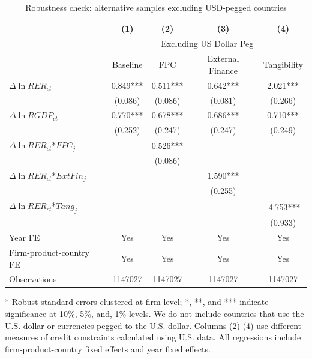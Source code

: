 \begin{table}[htbp]
	\centering
	\caption{Robustness check: alternative samples excluding USD-pegged countries}
	\begin{threeparttable}
	\begin{tabular}{lcccc}
		\toprule
		& (1)   & (2)   & (3)   & (4) \\
		\midrule
		& \multicolumn{4}{c}{Excluding US Dollar Peg} \\
		& Baseline & FPC   & External Finance & Tangibility \\
		\midrule
		$\Delta \ln RER_{ct}$ & 0.849*** & 0.511*** & 0.642*** & 2.021*** \\
		& (0.086) & (0.086) & (0.081) & (0.266) \\
		$\Delta \ln RGDP_{ct}$ & 0.770*** & 0.678*** & 0.686*** & 0.710*** \\
		& (0.252) & (0.247) & (0.247) & (0.249) \\
		$\Delta \ln RER_{ct}$*$FPC_{j}$ &    & 0.526*** &       &  \\
            & & (0.086) &       &  \\
		$\Delta \ln RER_{ct}$*$ExtFin_{j}$ & &       & 1.590*** &  \\
		& &       & (0.255) &  \\
		$\Delta \ln RER_{ct}$*$Tang_{j}$ & &       &       & -4.753*** \\
		& &       &       & (0.933) \\
		Year FE  &   Yes    & Yes   & Yes   & Yes \\
		Firm-product-country FE &   Yes    & Yes   & Yes   & Yes \\
		Observations & 1147027 & 1147027 & 1147027 & 1147027 \\
		\bottomrule
	\end{tabular}
	\begin{tablenotes}
		\footnotesize
		\item[*] Robust standard errors clustered at firm level; *, **, and *** indicate significance at 10\%, 5\%, and, 1\% levels. We do not include countries that use the U.S. dollar or currencies pegged to the U.S. dollar. Columns (2)-(4) use different measures of credit constraints calculated using U.S. data. All regressions include firm-product-country fixed effects and year fixed effects.
	\end{tablenotes}
        \end{threeparttable}
        \label{tab.robust.nopeg}
\end{table}

